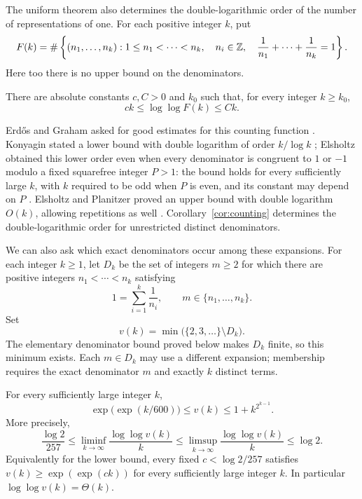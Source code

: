 The uniform theorem also determines the double-logarithmic order of
the number of representations of one. For each positive integer $k$, put
\[
 F(k)=\#\left\{(n_1,\ldots,n_k):
  1\le n_1<\cdots<n_k,\quad n_i\in\mathbb Z,\quad
  \frac1{n_1}+\cdots+\frac1{n_k}=1\right\}.
\]
Here too there is no upper bound on the denominators.

\begin{corollary}\label{cor:counting}
There are absolute constants $c,C>0$ and $k_0$ such that, for every
integer $k\ge k_0$,
\[
 ck\le\log\log F(k)\le Ck.
\]
\end{corollary}

Erd\H{o}s and Graham asked for good estimates for this counting function
\cite[p.~32]{ErdosGraham1980}. Konyagin stated a lower bound with
double logarithm of order $k/\log k$ \cite[Theorem~1]{Konyagin2014};
Elsholtz obtained this lower order even when every denominator is
congruent to $1$ or $-1$ modulo a fixed squarefree integer $P>1$:
the bound holds for every sufficiently large $k$, with $k$ required
to be odd when $P$ is even, and its constant may depend on $P$
\cite[Theorem~1.1]{Elsholtz2016}. Elsholtz and Planitzer proved an upper
bound with double logarithm $O(k)$, allowing repetitions as well
\cite[Corollary~3(2)]{ElsholtzPlanitzer2021}.
Corollary~\ref{cor:counting} determines the double-logarithmic order for
unrestricted distinct denominators.


We can also ask which exact denominators occur among these expansions.
For each integer $k\ge1$, let $D_k$ be the set of integers $m\ge2$
for which there are positive integers $n_1<\cdots<n_k$ satisfying
\[
 1=\sum_{i=1}^{k}\frac1{n_i},\qquad
 m\in\{n_1,\ldots,n_k\}.
\]
Set
\[
 v(k)=\min\bigl(\{2,3,\ldots\}\setminus D_k\bigr).
\]
The elementary denominator bound proved below makes $D_k$ finite, so
this minimum exists. Each $m\in D_k$ may use a different expansion;
membership requires the exact denominator $m$ and exactly $k$ distinct
terms.

\begin{corollary}\label{cor:prescribed}
For every sufficiently large integer $k$,
\[
 \exp\bigl(\exp(k/600)\bigr)\le v(k)\le1+k^{2^{k-1}}.
\]
More precisely,
\[
 \frac{\log2}{257}
 \le\liminf_{k\to\infty}\frac{\log\log v(k)}k
 \le\limsup_{k\to\infty}\frac{\log\log v(k)}k
 \le\log2.
\]
Equivalently for the lower bound, every fixed $c<\log2/257$ satisfies
$v(k)\ge\exp(\exp(ck))$ for every sufficiently large integer $k$.
In particular $\log\log v(k)=\Theta(k)$.
\end{corollary}

